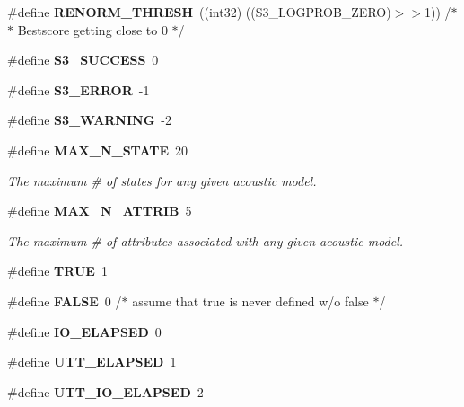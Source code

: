 \begin{DoxyCompactItemize}
\item 
\#define {\bfseries R\-E\-N\-O\-R\-M\-\_\-\-T\-H\-R\-E\-S\-H}~((int32) ((S3\-\_\-\-L\-O\-G\-P\-R\-O\-B\-\_\-\-Z\-E\-R\-O)$>$$>$1))       /$\ast$$\ast$ Bestscore getting close to 0 $\ast$/\label{s3types_8h_a610a0917725582c80011c031d1a402b8}

\item 
\#define {\bfseries S3\-\_\-\-S\-U\-C\-C\-E\-S\-S}~0\label{s3types_8h_a1bb6112acd0be019c61bc87890a5e527}

\item 
\#define {\bfseries S3\-\_\-\-E\-R\-R\-O\-R}~-\/1\label{s3types_8h_a3d4835a7a30401faf5d012927996c62a}

\item 
\#define {\bfseries S3\-\_\-\-W\-A\-R\-N\-I\-N\-G}~-\/2\label{s3types_8h_a38d65894166f39b4000c6018be946bc5}

\item 
\#define {\bf M\-A\-X\-\_\-\-N\-\_\-\-S\-T\-A\-T\-E}~20\label{s3types_8h_a0aed240c1318ac601a4a35ba21c152b6}

\begin{DoxyCompactList}\small\item\em The maximum \# of states for any given acoustic model. \end{DoxyCompactList}\item 
\#define {\bf M\-A\-X\-\_\-\-N\-\_\-\-A\-T\-T\-R\-I\-B}~5\label{s3types_8h_acfbabf70ac5778a1d060ac25b0dff433}

\begin{DoxyCompactList}\small\item\em The maximum \# of attributes associated with any given acoustic model. \end{DoxyCompactList}\item 
\#define {\bfseries T\-R\-U\-E}~1\label{s3types_8h_aa8cecfc5c5c054d2875c03e77b7be15d}

\item 
\#define {\bfseries F\-A\-L\-S\-E}~0 /$\ast$ assume that true is never defined w/o false $\ast$/\label{s3types_8h_aa93f0eb578d23995850d61f7d61c55c1}

\item 
\#define {\bfseries I\-O\-\_\-\-E\-L\-A\-P\-S\-E\-D}~0\label{s3types_8h_a8506cbe30493f34c2e82a91572004db6}

\item 
\#define {\bfseries U\-T\-T\-\_\-\-E\-L\-A\-P\-S\-E\-D}~1\label{s3types_8h_aff1028519f30eb719a5b8344c317adbc}

\item 
\#define {\bfseries U\-T\-T\-\_\-\-I\-O\-\_\-\-E\-L\-A\-P\-S\-E\-D}~2\label{s3types_8h_a7c02eadda7025b7054a574bbd00e09d8}


\end{DoxyCompactItemize}
